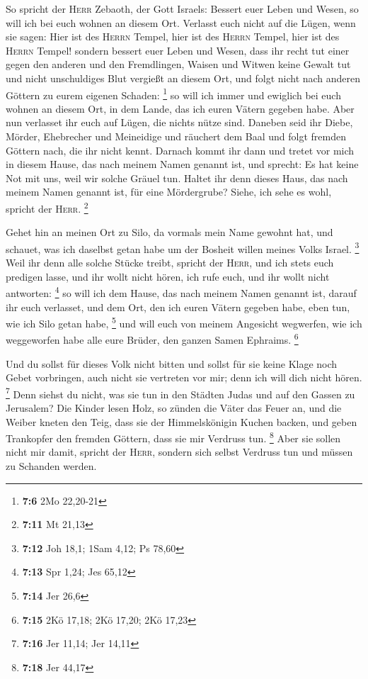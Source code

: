  So spricht der \textsc{Herr} Zebaoth, der Gott Israels:
Bessert euer Leben und Wesen, so will ich bei euch wohnen an diesem Ort.
 Verlasst euch nicht auf die Lügen, wenn sie sagen: Hier
ist des \textsc{Herrn} Tempel, hier ist des \textsc{Herrn} Tempel, hier
ist des \textsc{Herrn} Tempel!  sondern bessert euer Leben
und Wesen, dass ihr recht tut einer gegen den anderen  und
den Fremdlingen, Waisen und Witwen keine Gewalt tut und nicht
unschuldiges Blut vergießt an diesem Ort, und folgt nicht nach anderen
Göttern zu eurem eigenen Schaden: \footnote{\textbf{7:6} 2Mo 22,20-21}
 so will ich immer und ewiglich bei euch wohnen an diesem
Ort, in dem Lande, das ich euren Vätern gegeben habe. 
Aber nun verlasset ihr euch auf Lügen, die nichts nütze sind.
 Daneben seid ihr Diebe, Mörder, Ehebrecher und Meineidige
und räuchert dem Baal und folgt fremden Göttern nach, die ihr nicht
kennt.  Darnach kommt ihr dann und tretet vor mich in
diesem Hause, das nach meinem Namen genannt ist, und sprecht: Es hat
keine Not mit uns, weil wir solche Gräuel tun.  Haltet
ihr denn dieses Haus, das nach meinem Namen genannt ist, für eine
Mördergrube? Siehe, ich sehe es wohl, spricht der \textsc{Herr}.
\footnote{\textbf{7:11} Mt 21,13}

 Gehet hin an meinen Ort zu Silo, da vormals mein Name
gewohnt hat, und schauet, was ich daselbst getan habe um der Bosheit
willen meines Volks Israel. \footnote{\textbf{7:12} Joh 18,1; 1Sam 4,12;
  Ps 78,60}  Weil ihr denn alle solche Stücke treibt,
spricht der \textsc{Herr}, und ich stets euch predigen lasse, und ihr
wollt nicht hören, ich rufe euch, und ihr wollt nicht antworten:
\footnote{\textbf{7:13} Spr 1,24; Jes 65,12}  so will ich
dem Hause, das nach meinem Namen genannt ist, darauf ihr euch verlasset,
und dem Ort, den ich euren Vätern gegeben habe, eben tun, wie ich Silo
getan habe, \footnote{\textbf{7:14} Jer 26,6}  und will
euch von meinem Angesicht wegwerfen, wie ich weggeworfen habe alle eure
Brüder, den ganzen Samen Ephraims. \footnote{\textbf{7:15} 2Kö 17,18;
  2Kö 17,20; 2Kö 17,23}

 Und du sollst für dieses Volk nicht bitten und sollst
für sie keine Klage noch Gebet vorbringen, auch nicht sie vertreten vor
mir; denn ich will dich nicht hören. \footnote{\textbf{7:16} Jer 11,14;
  Jer 14,11}  Denn siehst du nicht, was sie tun in den
Städten Judas und auf den Gassen zu Jerusalem?  Die
Kinder lesen Holz, so zünden die Väter das Feuer an, und die Weiber
kneten den Teig, dass sie der Himmelskönigin Kuchen backen, und geben
Trankopfer den fremden Göttern, dass sie mir Verdruss tun. \footnote{\textbf{7:18}
  Jer 44,17}  Aber sie sollen nicht mir damit, spricht
der \textsc{Herr}, sondern sich selbst Verdruss tun und müssen zu
Schanden werden.


